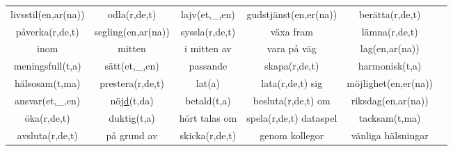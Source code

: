 \begin{center}
\begin{adjustwidth}{-2.2cm}{}
\begin{tabular}{|c c c c c c|}
            livsstil(en,ar(na)) & odla(r,de,t) & lajv(et,\_,en) & gudstjänst(en,er(na)) & berätta(r,de,t) & \\
            påverka(r,de,t) & segling(en,ar(na)) & syssla(r,de,t) & växa fram & lämna(r,de,t) & \\
            inom & mitten & i mitten av & vara på väg & lag(en,ar(na)) & \\
            meningsfull(t,a) & sätt(et,\_,en) & passande & skapa(r,de,t) & harmonisk(t,a) & \\
            hälsosam(t,ma) & prestera(r,de,t) & lat(a) & lata(r,de,t) sig & möjlighet(en,er(na)) & \\
            ansvar(et,\_,en) & nöj\underline{d}(t,da) & betald(t,a) & besluta(r,de,t) om & riksdag(en,ar(na)) & \\
            öka(r,de,t) & duktig(t,a) & hört talas om & spela(r,de,t) dataspel & tacksam(t,ma) & \\
            avsluta(r,de,t) & på grund av & skicka(r,de,t) & genom kollegor & vänliga hälsningar & \\
            \hline
        \end{tabular}
    \end{adjustwidth}
\end{center}


